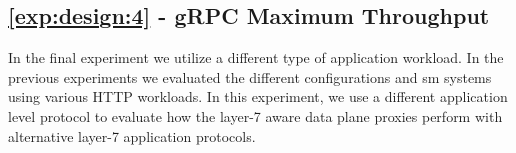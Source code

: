 
\subsection{\ref{exp:design:4} - gRPC Maximum Throughput}
\label{sec:experiments:results:per-experiment:04}

In the final experiment we utilize a different type of application workload. In the previous experiments we evaluated the different configurations and \gls{sm} systems using various HTTP workloads. In this experiment, we use a different application level protocol to evaluate how the layer-7 aware data plane proxies perform with alternative layer-7 application protocols. 



\begin{figure}[ht]
\centering
{}
\end{figure}
